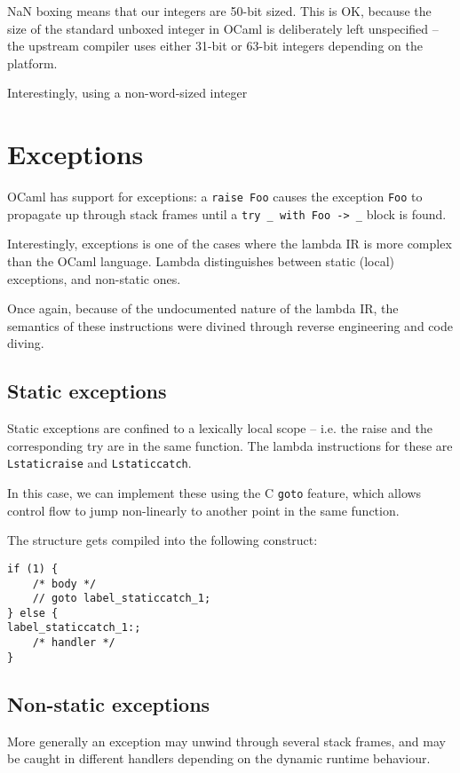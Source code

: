 \documentclass[12pt,a4paper,twoside,openright]{report}
\begin{document}
NaN boxing means that our integers are 50-bit sized. This is OK, because the size of the standard unboxed integer in OCaml is deliberately left unspecified -- the upstream compiler uses either 31-bit or 63-bit integers depending on the platform.

Interestingly, using a non-word-sized integer

\section{Exceptions}\label{exceptions}

OCaml has support for exceptions: a \lstinline!raise Foo! causes the
exception \lstinline!Foo! to propagate up through stack frames until a
\lstinline!try _ with Foo -> _! block is found.

Interestingly, exceptions is one of the cases where the lambda IR is more
complex than the OCaml language. Lambda distinguishes between static (local)
exceptions, and non-static ones.

Once again, because of the undocumented nature of the lambda IR, the semantics
of these instructions were divined through reverse engineering and code diving.

\subsection{Static exceptions}

Static exceptions are confined to a lexically local scope -- i.e. the raise and
the corresponding try are in the same function. The lambda instructions for
these are \lstinline!Lstaticraise! and \lstinline!Lstaticcatch!.

In this case, we can implement these using the C \lstinline!goto! feature,
which allows control flow to jump non-linearly to another point in the same
function.

The structure gets compiled into the following construct:

\begin{lstlisting}
if (1) {
    /* body */
    // goto label_staticcatch_1;
} else {
label_staticcatch_1:;
    /* handler */
}
\end{lstlisting}

\subsection{Non-static exceptions}

More generally an exception may unwind through several stack frames, and may be
caught in different handlers depending on the dynamic runtime behaviour.
\end{document}
